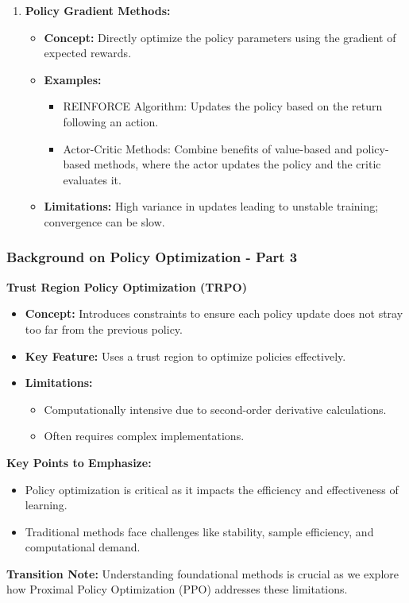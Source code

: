 \documentclass{beamer}
\begin{document}
\begin{frame}[fragile]
\begin{enumerate}
        \item \textbf{Policy Gradient Methods:}
            \begin{itemize}
                \item \textbf{Concept:} Directly optimize the policy parameters using the gradient of expected rewards.
                \item \textbf{Examples:}
                    \begin{itemize}
                        \item REINFORCE Algorithm: Updates the policy based on the return following an action.
                        \item Actor-Critic Methods: Combine benefits of value-based and policy-based methods, where the actor updates the policy and the critic evaluates it.
                    \end{itemize}
                \item \textbf{Limitations:} High variance in updates leading to unstable training; convergence can be slow.
            \end{itemize}
    \end{enumerate}
\end{frame}

\begin{frame}[fragile]
    \frametitle{Background on Policy Optimization - Part 3}
    \textbf{Trust Region Policy Optimization (TRPO)}
    
    \begin{itemize}
        \item \textbf{Concept:} Introduces constraints to ensure each policy update does not stray too far from the previous policy.
        \item \textbf{Key Feature:} Uses a trust region to optimize policies effectively.
        \item \textbf{Limitations:} 
            \begin{itemize}
                \item Computationally intensive due to second-order derivative calculations.
                \item Often requires complex implementations.
            \end{itemize}
    \end{itemize}
    
    \textbf{Key Points to Emphasize:}
    \begin{itemize}
        \item Policy optimization is critical as it impacts the efficiency and effectiveness of learning.
        \item Traditional methods face challenges like stability, sample efficiency, and computational demand.
    \end{itemize}

    \textbf{Transition Note:}
    Understanding foundational methods is crucial as we explore how Proximal Policy Optimization (PPO) addresses these limitations.
\end{frame}
\end{document}
